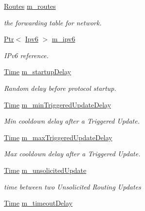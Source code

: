 \begin{DoxyCompactItemize}
\item 
\hyperlink{classns3_1_1RipNg_a1d5addc59db17a00021a99e7d6ff9ccd}{Routes} \hyperlink{classns3_1_1RipNg_acfc1011b140f9e612a8c27c9bfb4c6b5}{m\+\_\+routes}
\begin{DoxyCompactList}\small\item\em the forwarding table for network. \end{DoxyCompactList}\item 
\hyperlink{classns3_1_1Ptr}{Ptr}$<$ \hyperlink{classns3_1_1Ipv6}{Ipv6} $>$ \hyperlink{classns3_1_1RipNg_aca7a023799ce2004499a826ba5d5d3fe}{m\+\_\+ipv6}
\begin{DoxyCompactList}\small\item\em I\+Pv6 reference. \end{DoxyCompactList}\item 
\hyperlink{classns3_1_1Time}{Time} \hyperlink{classns3_1_1RipNg_a11c536612cb48e139d4a3b8d34c9ec3a}{m\+\_\+startup\+Delay}
\begin{DoxyCompactList}\small\item\em Random delay before protocol startup. \end{DoxyCompactList}\item 
\hyperlink{classns3_1_1Time}{Time} \hyperlink{classns3_1_1RipNg_a4da2b49a558678bd4c51a995fbfbf7af}{m\+\_\+min\+Triggered\+Update\+Delay}
\begin{DoxyCompactList}\small\item\em Min cooldown delay after a Triggered Update. \end{DoxyCompactList}\item 
\hyperlink{classns3_1_1Time}{Time} \hyperlink{classns3_1_1RipNg_a7087e78333b3a5caabc13a83753a13a2}{m\+\_\+max\+Triggered\+Update\+Delay}
\begin{DoxyCompactList}\small\item\em Max cooldown delay after a Triggered Update. \end{DoxyCompactList}\item 
\hyperlink{classns3_1_1Time}{Time} \hyperlink{classns3_1_1RipNg_a8bedf450622f395cc52c1d37dc4d7a40}{m\+\_\+unsolicited\+Update}
\begin{DoxyCompactList}\small\item\em time between two Unsolicited Routing Updates \end{DoxyCompactList}\item 
\hyperlink{classns3_1_1Time}{Time} \hyperlink{classns3_1_1RipNg_aed45845b278332b589e76304a3701d72}{m\+\_\+timeout\+Delay}

\end{DoxyCompactItemize}
